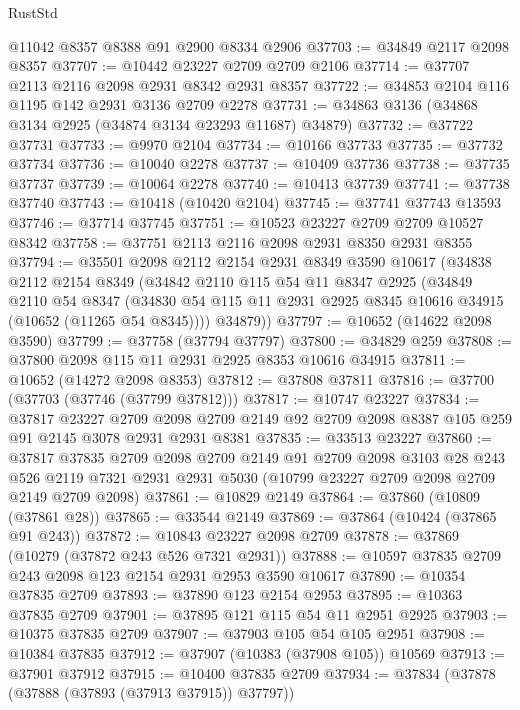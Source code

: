 \begin{lexlean}{RustStd}
\begin{coremodule}
    @11042
    @8357
    @8388
    @91
    @2900
    @8334
    @2906
@37703 := @34849 @2117 @2098 @8357
@37707 := @10442 @23227 @2709 @2709 @2106
@37714 := @37707 @2113 @2116 @2098 @2931 @8342 @2931 @8357
@37722 := @34853 @2104 @116 @1195 @142 @2931 @3136 @2709 @2278
@37731 := @34863 @3136 (@34868 @3134 @2925 (@34874 @3134 @23293 @11687) @34879)
@37732 := @37722 @37731
@37733 := @9970 @2104
@37734 := @10166 @37733
@37735 := @37732 @37734
@37736 := @10040 @2278
@37737 := @10409 @37736
@37738 := @37735 @37737
@37739 := @10064 @2278
@37740 := @10413 @37739
@37741 := @37738 @37740
@37743 := @10418 (@10420 @2104)
@37745 := @37741 @37743 @13593
@37746 := @37714 @37745
@37751 := @10523 @23227 @2709 @2709 @10527 @8342
@37758 := @37751 @2113 @2116 @2098 @2931 @8350 @2931 @8355
@37794 := @35501
    @2098
    @2112
    @2154
    @2931
    @8349
    @3590
    @10617
    (@34838
      @2112
      @2154
      @8349
      (@34842
        @2110
        @115
        @54
        @11
        @8347
        @2925
        (@34849
          @2110
          @54
          @8347
          (@34830 @54 @115 @11 @2931 @2925 @8345 @10616 @34915 (@10652 (@11265 @54 @8345))))
        @34879))
@37797 := @10652 (@14622 @2098 @3590)
@37799 := @37758 (@37794 @37797)
@37800 := @34829 @259
@37808 := @37800 @2098 @115 @11 @2931 @2925 @8353 @10616 @34915
@37811 := @10652 (@14272 @2098 @8353)
@37812 := @37808 @37811
@37816 := @37700 (@37703 (@37746 (@37799 @37812)))
@37817 := @10747 @23227
@37834 := @37817
    @23227
    @2709
    @2098
    @2709
    @2149
    @92
    @2709
    @2098
    @8387
    @105
    @259
    @91
    @2145
    @3078
    @2931
    @2931
    @8381
@37835 := @33513 @23227
@37860 := @37817
    @37835
    @2709
    @2098
    @2709
    @2149
    @91
    @2709
    @2098
    @3103
    @28
    @243
    @526
    @2119
    @7321
    @2931
    @2931
    @5030
    (@10799 @23227 @2709 @2098 @2709 @2149 @2709 @2098)
@37861 := @10829 @2149
@37864 := @37860 (@10809 (@37861 @28))
@37865 := @33544 @2149
@37869 := @37864 (@10424 (@37865 @91 @243))
@37872 := @10843 @23227 @2098 @2709
@37878 := @37869 (@10279 (@37872 @243 @526 @7321 @2931))
@37888 := @10597 @37835 @2709 @243 @2098 @123 @2154 @2931 @2953 @3590 @10617
@37890 := @10354 @37835 @2709
@37893 := @37890 @123 @2154 @2953
@37895 := @10363 @37835 @2709
@37901 := @37895 @121 @115 @54 @11 @2951 @2925
@37903 := @10375 @37835 @2709
@37907 := @37903 @105 @54 @105 @2951
@37908 := @10384 @37835
@37912 := @37907 (@10383 (@37908 @105)) @10569
@37913 := @37901 @37912
@37915 := @10400 @37835 @2709
@37934 := @37834
    (@37878 (@37888 (@37893 (@37913 @37915)) @37797))

\end{coremodule}
\end{lexlean}
